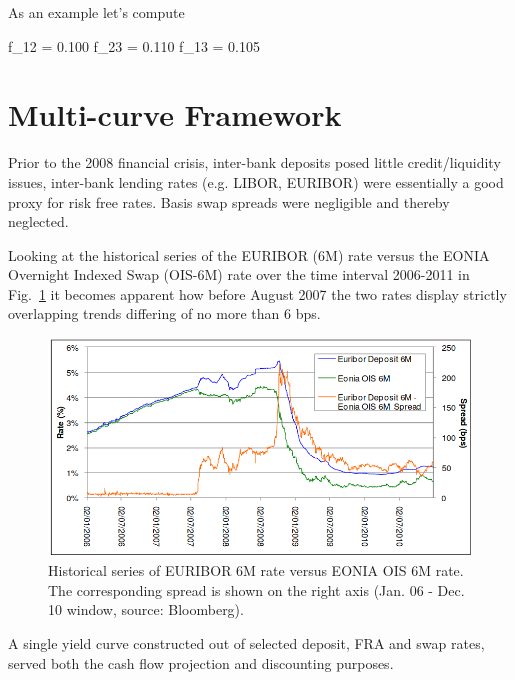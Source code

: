 
As an example let's compute


\begin{ioutput}
f_12 = 0.100
f_23 = 0.110
f_13 = 0.105
\end{ioutput}

\section{Multi-curve Framework}
\label{sec:financial-crisis}


Prior to the 2008 financial crisis, inter-bank deposits posed little credit/liquidity issues, inter-bank lending rates (e.g. LIBOR, EURIBOR) were essentially a good proxy for risk free rates. Basis swap spreads were negligible and thereby neglected. 

Looking at the historical series of the EURIBOR (6M) rate versus the EONIA Overnight Indexed Swap (OIS-6M) rate over the time interval 2006-2011 in Fig.~\ref{fig:credit_crunch} it becomes apparent how before August 2007 the two rates display strictly overlapping trends differing of no more than 6 bps.

\begin{figure}[htb]
	\centering
	\includegraphics[width=0.9\linewidth]{figures/credit_crunch.png}
	\caption{Historical series of EURIBOR 6M rate versus EONIA OIS 6M rate. The corresponding spread 
		is shown on the right axis (Jan. 06 - Dec. 10 window, source: Bloomberg).}
	\label{fig:credit_crunch}
\end{figure}

A single yield curve constructed out of selected deposit, FRA and swap rates, served both the cash flow projection and discounting purposes.

